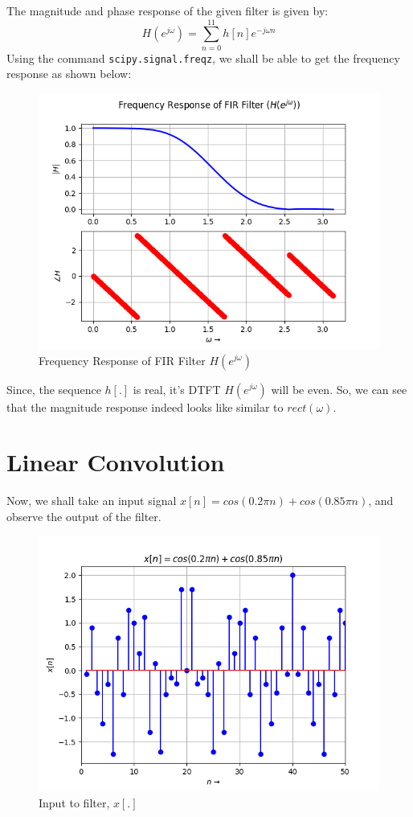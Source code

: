 \documentclass[12pt, a4paper, twoside]{article}
\begin{document}
The magnitude and phase response of the given filter is given by:
\begin{equation}
    H(e^{j\omega}) = \sum_{n=0}^{11}h[n]e^{-j\omega n}
\end{equation}
Using the command \texttt{scipy.signal.freqz}, we shall be able to get the frequency response as shown below:
\begin{figure}[H]
    \centering
    \includegraphics[scale=0.5]{Fig1.png}
    \caption{Frequency Response of FIR Filter $H(e^{j\omega})$}
    \label{fig:Fig1}
\end{figure}

Since, the sequence $h[.]$ is real, it's DTFT $H(e^{j\omega})$ will be even\footnotemark. So, we can see that the magnitude response indeed looks like similar to $rect(\omega)$. 
\section{Linear Convolution}
Now, we shall take an input signal $x[n] = cos(0.2\pi n)+cos(0.85\pi n)$, and observe the output of the filter.
\begin{figure}[H]
    \centering
    \includegraphics[scale=0.5]{Fig2.png}
    \caption{Input to filter, $x[.]$}
    \label{fig:Fig2}
\end{figure}
\end{document}
